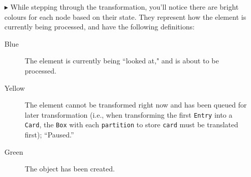 \begin{itemize}
\clearpage

\item[$\blacktriangleright$] While stepping through the transformation, you'll notice there are bright colours for each node based on their state. They
represent how the element is currently being processed, and have the following definitions:

\begin{description}
  \item[Blue] The element is currently being ``looked at," and is about to be processed.
  
  \item[Yellow] The element cannot be transformed right now and has been queued for later transformation (i.e., when transforming the first
  \texttt{Entry} into a \texttt{Card}, the \texttt{Box} with each \texttt{partition} to store \texttt{card} must be translated first); ``Paused.''
  
  \item[Green] The object has been created.

\end{description}

\end{itemize}
